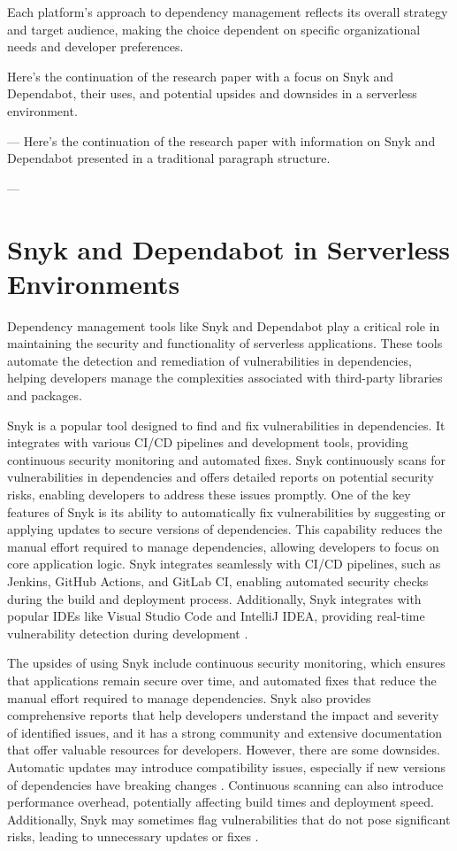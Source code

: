 \documentclass[sigconf]{acmart}
\begin{document}
Each platform's approach to dependency management reflects its overall strategy and target audience, making the choice dependent on specific organizational needs and developer preferences.


Here's the continuation of the research paper with a focus on Snyk and Dependabot, their uses, and potential upsides and downsides in a serverless environment.

---
Here's the continuation of the research paper with information on Snyk and Dependabot presented in a traditional paragraph structure.

---

\section{Snyk and Dependabot in Serverless Environments}

Dependency management tools like Snyk and Dependabot play a critical role in maintaining the security and functionality of serverless applications. These tools automate the detection and remediation of vulnerabilities in dependencies, helping developers manage the complexities associated with third-party libraries and packages.

Snyk is a popular tool designed to find and fix vulnerabilities in dependencies. It integrates with various CI/CD pipelines and development tools, providing continuous security monitoring and automated fixes. Snyk continuously scans for vulnerabilities in dependencies and offers detailed reports on potential security risks, enabling developers to address these issues promptly. One of the key features of Snyk is its ability to automatically fix vulnerabilities by suggesting or applying updates to secure versions of dependencies. This capability reduces the manual effort required to manage dependencies, allowing developers to focus on core application logic. Snyk integrates seamlessly with CI/CD pipelines, such as Jenkins, GitHub Actions, and GitLab CI, enabling automated security checks during the build and deployment process. Additionally, Snyk integrates with popular IDEs like Visual Studio Code and IntelliJ IDEA, providing real-time vulnerability detection during development \cite{snyk2023, snykIDE2023}.

The upsides of using Snyk include continuous security monitoring, which ensures that applications remain secure over time, and automated fixes that reduce the manual effort required to manage dependencies. Snyk also provides comprehensive reports that help developers understand the impact and severity of identified issues, and it has a strong community and extensive documentation that offer valuable resources for developers. However, there are some downsides. Automatic updates may introduce compatibility issues, especially if new versions of dependencies have breaking changes \cite{benischke2023updates}. Continuous scanning can also introduce performance overhead, potentially affecting build times and deployment speed. Additionally, Snyk may sometimes flag vulnerabilities that do not pose significant risks, leading to unnecessary updates or fixes \cite{snykFalsePositives2023}.
\end{document}
